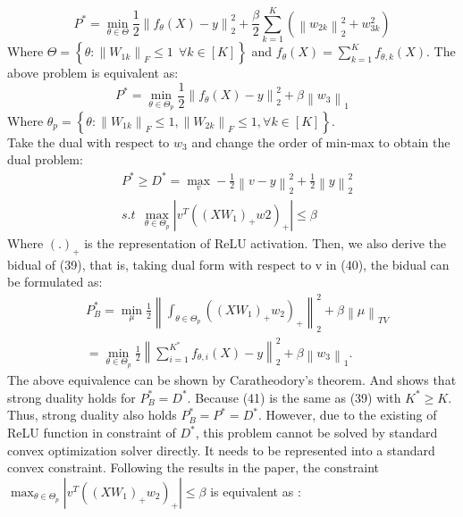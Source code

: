 \documentclass{article}
\begin{document}
\begin{equation}
    P^*=\min_{\theta \in \Theta}\frac{1}{2}\left \| f_\theta(X)-y \right \|_2^2+\frac{\beta}{2}\sum_{k=1}^{K}(\left \| w_{2k} \right \|_2^2+w_{3k}^2)
\end{equation}
Where $\Theta=\left \{ \theta: \left \| W_{1k} \right \|_F \leq 1\ \ \forall k \in [K]\right \}$ and $f_{\theta}(X)=\sum_{k=1}^{K}f_{\theta,k}(X) $. The above problem is equivalent as:
\begin{equation}
    P^*=\min_{\theta \in \Theta_p} \frac{1}{2} \left \| f_\theta(X)-y \right \|_2^2+\beta\left \| w_3 \right \|_1
\end{equation}
Where $\theta_p=\left \{ \theta: \left \| W_{1k} \right \|_F \leq 1,\left \| W_{2k} \right \|_F\leq 1, \forall k \in [K]\right \}$.\\
Take the dual with respect to $w_3$ and change the order of min-max to obtain the dual problem:
\begin{equation}
    \begin{aligned}
        &P^* \geq D^*=\max_{v}-\frac{1}{2} \left \| v-y \right \|_2^2+\frac{1}{2} \left \| y \right \|_2^2 \\
        &s.t\ \  \max_{\theta \in \Theta_p} \left | v^T((XW_1)_+w2)_+ \right | \leq \beta
    \end{aligned}
\end{equation}
Where $(.)_+$ is the representation of ReLU activation. Then, we also derive the bidual of (39), that is, taking dual form with respect to v in (40), the bidual can be formulated as:
\begin{equation}
    \begin{aligned}
        &P^*_B= \min_{\mu}\frac{1}{2}\left \| \int _{\theta \in \Theta_p}((XW_1)_+w_2)_+  \right \| _2^2+ \beta \left \| \mu \right \|_{TV} \\
        &=\min_{\theta \in \Theta_p} \frac{1}{2} \left \| \sum_{i=1}^{K^*}f_{\theta, i}(X)-y\right \|_2^2+\beta \left \| w_3 \right \|_1.
    \end{aligned}
\end{equation}
The above equivalence can be shown by Caratheodory's theorem. And \cite{deeprelu} shows that strong duality holds for $P_B^*=D^*$. Because (41) is the same as (39) with $K^* \geq K$. Thus, strong duality also holds $P^*_B=P^*=D^*$. However, due to the existing of ReLU function in constraint of $D^*$, this problem cannot be solved by standard convex optimization solver directly. It needs to be represented into a standard convex constraint. Following the results in the paper\cite{deeprelu}, the constraint $ \max_{\theta \in \Theta_p}\left | v^T((XW_1)_+w_2)_+ \right | \leq \beta$ is equivalent as :
\end{document}
